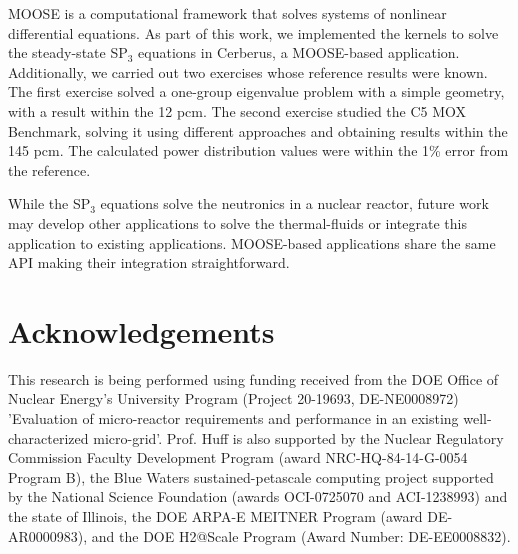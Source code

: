 \documentclass{anstrans}
\begin{document}
MOOSE is a computational framework that solves systems of nonlinear differential equations.
As part of this work, we implemented the kernels to solve the steady-state SP$_3$ equations in Cerberus, a MOOSE-based application.
Additionally, we carried out two exercises whose reference results were known.
The first exercise solved a one-group eigenvalue problem with a simple geometry, with a result within the 12 pcm.
The second exercise studied the C5 MOX Benchmark, solving it using different approaches and obtaining results within the 145 pcm.
The calculated power distribution values were within the 1\% error from the reference.

While the SP$_3$ equations solve the neutronics in a nuclear reactor, future work may develop other applications to solve the thermal-fluids or integrate this application to existing applications.
MOOSE-based applications share the same API making their integration straightforward.


\section{Acknowledgements}

This research is being performed using funding received from the DOE Office of Nuclear Energy's University Program (Project 20-19693, DE-NE0008972) 'Evaluation of micro-reactor requirements and performance in an existing well-characterized micro-grid'.
Prof. Huff is also supported by the Nuclear Regulatory Commission Faculty Development Program (award NRC-HQ-84-14-G-0054 Program B), the Blue Waters sustained-petascale computing project supported by the National Science Foundation (awards OCI-0725070 and ACI-1238993) and the state of Illinois, the DOE ARPA-E MEITNER Program (award DE-AR0000983), and the DOE H2@Scale Program (Award Number: DE-EE0008832).



\end{document}
